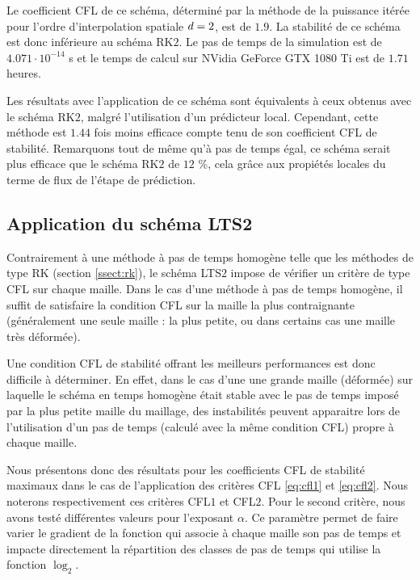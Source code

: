 Le coefficient CFL de ce schéma, déterminé par la méthode de la puissance
itérée pour l'ordre d'interpolation spatiale $d=2$, est de $1.9$.
La stabilité de ce schéma est donc inférieure au schéma RK$2$.
Le pas de temps de la simulation est de $4.071 \cdot 10^{-14}$ s
et le temps de calcul sur NVidia GeForce GTX 1080 Ti est de $1.71$ heures.

Les résultats avec l'application de ce schéma sont équivalents à ceux obtenus
avec le schéma RK$2$, malgré l'utilisation d'un prédicteur local.
Cependant, cette méthode est $1.44$ fois moins efficace
compte tenu de son coefficient CFL de stabilité.
Remarquons tout de même qu'à pas de temps égal, ce schéma serait plus efficace
que le schéma RK$2$ de $12$ \%, cela grâce aux propiétés locales du terme de flux
de l'étape de prédiction.
\\


\subsection{Application du schéma LTS2}
\label{ssect:tete_simplifiee_dt_local}


Contrairement à une méthode à pas de temps homogène telle que
les méthodes de type RK (section \ref{ssect:rk}), le schéma LTS$2$ impose
de vérifier un critère de type CFL sur chaque maille.
Dans le cas d'une méthode à pas de temps homogène,
il suffit de satisfaire
la condition CFL sur la maille la plus
contraignante (généralement une seule maille : la plus petite, ou
dans certains cas une maille très déformée).

Une condition CFL de stabilité offrant les meilleurs performances
est donc difficile à déterminer. En effet, dans le cas d'une une grande
maille (déformée) sur laquelle le schéma en temps homogène était stable avec
le pas de temps imposé par la plus petite maille du maillage,
des instabilités peuvent apparaitre lors de l'utilisation d'un pas de
temps (calculé avec la même condition CFL) propre à chaque maille.

Nous présentons donc des résultats pour les coefficients CFL
de stabilité maximaux dans le cas de l'application des critères
CFL \eqref{eq:cfl1} et \eqref{eq:cfl2}.
Nous noterons respectivement ces critères CFL$1$ et CFL$2$.
Pour le second critère, nous avons testé différentes valeurs pour l'exposant $\alpha$.
Ce paramètre permet de faire varier le gradient de la fonction
qui associe à chaque maille son pas de temps et impacte directement
la répartition des classes de pas de temps qui utilise la fonction $\log_2$.
\\

